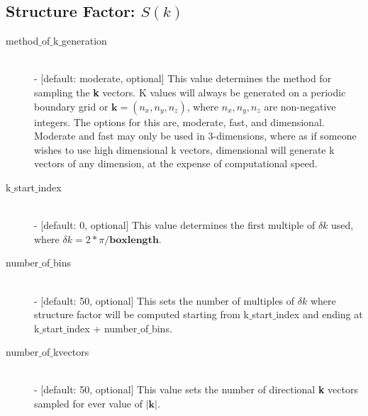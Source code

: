 \documentclass{article}
\begin{document}
\subsection{Structure Factor: $S(k)$} \label{sec::sofk_parm}
\begin{description}		
	\item[method$\_$of$\_$k$\_$generation] \hfill \\
	- [default: moderate, optional] This value determines the method for sampling the \textbf{k} vectors.  K values will always be generated on a periodic boundary grid or $\mathbf{k} = (n_x,n_y,n_z)$, where $n_x, n_y, n_z$ are non-negative integers.  The options for this are, moderate, fast, and dimensional.  Moderate and fast may only be used in 3-dimensions, where as if someone wishes to use high dimensional k vectors, dimensional will generate k vectors of any dimension, at the expense of computational speed.
	
	\item[k$\_$start$\_$index] \hfill \\
	- [default: 0, optional] This value determines the first multiple of $\delta k$ used, where $\delta k = 2*\pi/\textbf{boxlength}$.  
		
	\item[number$\_$of$\_$bins] \hfill \\
	- [default: 50, optional] This sets the number of multiples of $\delta k$ where structure factor will be computed starting from k$\_$start$\_$index and ending at k$\_$start$\_$index + number$\_$of$\_$bins. 
	
	\item[number$\_$of$\_$kvectors] \hfill \\
	- [default: 50, optional] This value sets the number of directional \textbf{k} vectors sampled for ever value of $|\bm{k}|$.  

\end{description}
\end{document}
